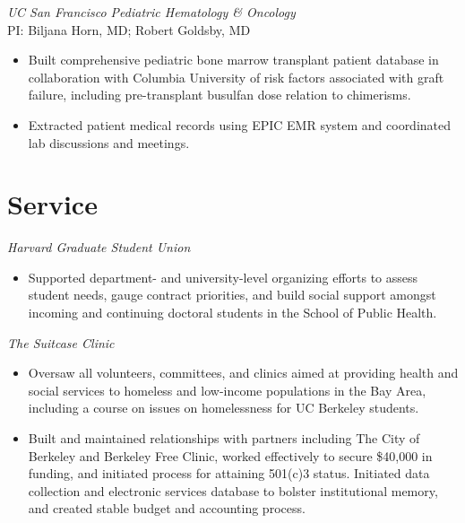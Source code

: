 \documentclass{cv_style}
\begin{document}
\textit{UC San Francisco Pediatric Hematology \& Oncology} \\
PI: Biljana Horn, MD; Robert Goldsby, MD
\begin{itemize}
    \item Built comprehensive pediatric bone marrow transplant patient database in collaboration with Columbia University of risk factors associated with graft failure, including pre-transplant busulfan dose relation to chimerisms.
    \item \parskip 1pt Extracted patient medical records using EPIC EMR system and coordinated lab discussions and meetings.
\end{itemize}



\section{Service}

\textit{Harvard Graduate Student Union}
\begin{itemize}
    \item Supported department- and university-level organizing efforts to assess student needs, gauge contract priorities, and build social support amongst incoming and continuing doctoral students in the School of Public Health. 
\end{itemize}

\textit{The Suitcase Clinic}
\begin{itemize}
    \item Oversaw all volunteers, committees, and clinics aimed at providing health and social services to homeless and low-income populations in the Bay Area, including a course on issues on homelessness for UC Berkeley  students. 
    \item \parskip 1pt Built and maintained relationships with partners including The City of Berkeley and Berkeley Free Clinic, worked effectively to secure \$40,000 in funding, and initiated process for attaining 501(c)3 status. Initiated data collection and electronic services database to bolster institutional memory, and created stable budget and accounting process.
\end{itemize}
\end{document}
